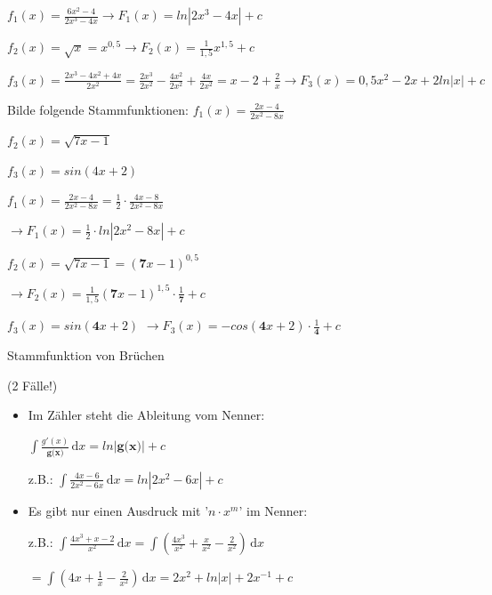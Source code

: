 \documentclass[paper=a6,landscape,ngerman,twoside=true,fontsize=12pt]{scrartcl}
\begin{document}
\begin{antwort}
	\flushleft
	$f_1(x)=\frac{6x^2-4}{2x^3-4x} \longrightarrow F_1(x)=ln|2x^3-4x|+c$ 
	
	\bigskip
	$f_2(x)=\sqrt{x}=x^{0,5} \longrightarrow F_2(x)=\frac{1}{1,5}x^{1,5}+c$
	
	\bigskip	
	$f_3(x)=\frac{2x^3-4x^2+4x}{2x^2}=\frac{2x^3}{2x^2}-\frac{4x^2}{2x^2}+\frac{4x}{2x^2}=x-2+\frac{2}{x} \longrightarrow F_3(x)=0,5x^2-2x+2ln|x|+c$	
\end{antwort}
\begin{frage}
	Bilde folgende Stammfunktionen: 
	\flushleft 
	$f_1(x)=\frac{2x-4}{2x^2-8x}$
	
	\bigskip
	$f_2(x)=\sqrt{7x-1}$
	
	\bigskip
	$f_3(x)=sin(4x+2)$	
\end{frage}
\begin{antwort}
	\flushleft
	$f_1(x)=\frac{2x-4}{2x^2-8x}=\frac{1}{2}\cdot\frac{4x-8}{2x^2-8x}$
	
    $\longrightarrow F_1(x)=\frac{1}{2}\cdot ln|2x^2-8x|+c$ 
	
	\bigskip
	$f_2(x)=\sqrt{7x-1}=(\textbf{7}x-1)^{0,5}$
	
	$\longrightarrow F_2(x)=\frac{1}{1,5}(\textbf{7}x-1)^{1,5}\cdot\frac{1}{\textbf{7}}+c$
	
	\bigskip	
	$f_3(x)=sin(\textbf{4}x+2)$
	$\longrightarrow F_3(x)=-cos(\textbf{4}x+2)\cdot\frac{1}{\textbf{4}}+c$	
\end{antwort}
\begin{frage}
	Stammfunktion von Brüchen
	
	(2 Fälle!)
\end{frage}
\begin{antwort}
\normalsize\begin{itemize}
	\item Im Zähler steht die Ableitung vom Nenner:
	
	$\displaystyle\int \! \frac{g'(x)}{\textbf{g(x)}} \, \mathrm{d}x=ln|\textbf{g(x)}|+c$
	
	z.B.: $\displaystyle\int \! \frac{4x-6}{{2x^2-6x}} \, \mathrm{d}x=ln|{2x^2-6x}|+c$
	\item Es gibt nur einen Ausdruck mit '$n \cdot x^m$' im Nenner:
	
	 z.B.: $\displaystyle\int \! \frac{4x^3+x-2}{{x^2}} \, \mathrm{d}x=\displaystyle\int \! (\frac{4x^3}{{x^2}}+\frac{x}{{x^2}}-\frac{2}{{x^2}}) \, \mathrm{d}x$
	 
	 $=\displaystyle\int \! (4x+\frac{1}{{x}}-\frac{2}{{x^2}}) \, \mathrm{d}x=\displaystyle 2x^2+ln|x|+2x^{-1}+c$
	\end{itemize}
\end{antwort}
\end{document}
